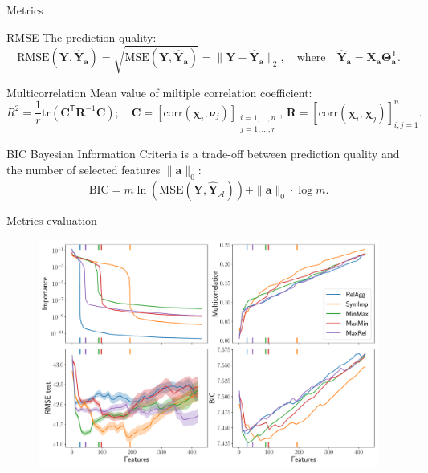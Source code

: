 \documentclass[9pt]{beamer}
\newcommand{\ba}{\mathbf{a}}
\newcommand{\bY}{\mathbf{Y}}
\newcommand{\bX}{\mathbf{X}}
\newcommand{\bC}{\mathbf{C}}
\newcommand{\cA}{\mathcal{A}}
\newcommand{\bchi}{\boldsymbol{\chi}}
\newcommand{\bnu}{\boldsymbol{\nu}}
\newcommand{\bTheta}{\boldsymbol{\Theta}}
\newcommand{\T}{\mathsf{T}}
\begin{document}
\begin{frame}{Metrics}

\begin{block}{RMSE}
	The prediction quality:
	\[
	\text{RMSE}(\bY, \widehat{\bY}_{\ba}) = \sqrt{\text{MSE} (\bY, \widehat{\bY}_{\ba})} =  \| \bY - \widehat{\bY}_{\ba} \|_2, \quad \text{where} \quad \widehat{\bY}_{\ba} = \bX_{\ba} \bTheta_{\ba}^{\T}.
	\]
\end{block}

\begin{block}{Multicorrelation}
Mean value of miltiple correlation coefficient:
\[
R^2 = \frac{1}{r} \text{tr} \left( \bC^{\T} \mathbf{R}^{-1} \bC \right); \quad \bC = [ \text{corr}(\bchi_i, \bnu_j)]_{\substack{i=1, \dots, n \\ j=1, \dots, r}}, \, \mathbf{R} = [ \text{corr}(\bchi_i, \bchi_j)]_{i, j = 1}^n.
\]
\end{block}
\begin{block}{BIC}
Bayesian Information Criteria is a trade-off between prediction quality and the number of selected features $\|\ba\|_0$:
\[
\text{BIC} = m \ln \left( \text{MSE} ( \bY, \widehat{\bY}_{\cA})\right) + \| \ba \|_0 \cdot \log m.
\]
\end{block}
\end{frame}
\begin{frame}{Metrics evaluation}
	\begin{figure}
		\includegraphics[width=\linewidth]{figs/ecog_3_18_metrics.pdf}
	\end{figure}
\end{frame}
\end{document}
